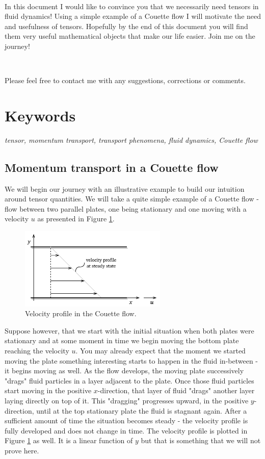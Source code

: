 \documentclass[10pt,twocolumn]{article}
\begin{document}
\,\,

In this document I would like to convince you that we necessarily need tensors in fluid dynamics! Using a simple example of a Couette flow I will motivate the need and usefulness of tensors. Hopefully by the end of this document you will find them very useful mathematical objects that make our life easier. Join me on the journey!

\,\,

Please feel free to contact me with any suggestions, corrections or comments.

\section*{Keywords}

\textit{tensor, momentum transport, transport phenomena, fluid dynamics, Couette flow}



\subsection*{Momentum transport in a Couette flow}

We will begin our journey with an illustrative example to build our intuition around tensor quantities. We will take a quite simple example of a Couette flow - flow between two parallel plates, one being stationary and one moving with a velocity $u$ as presented in Figure \ref{fig:couette-flow}.
\begin{figure}[H]
\centering\includegraphics[width=7cm]{couette-flow.png}
\caption{Velocity profile in the Couette flow.}
\label{fig:couette-flow}
\end{figure}
Suppose however, that we start with the initial situation when both plates were stationary and at some moment in time we begin moving the bottom plate reaching the velocity $u$. You may already expect that the moment we started moving the plate something interesting starts to happen in the fluid in-between - it begins moving as well. As the flow develops, the moving plate successively "drags" fluid particles in a layer adjacent to the plate. Once those fluid particles start moving in the positive $x$-direction, that layer of fluid "drags" another layer laying directly on top of it. This "dragging" progresses upward, in the positive $y$-direction, until at the top stationary plate the fluid is stagnant again. After a sufficient amount of time the situation becomes steady - the velocity profile is fully developed and does not change in time. The velocity profile is plotted in Figure \ref{fig:couette-flow} as well. It is a linear function of $y$ but that is something that we will not prove here.
\end{document}
